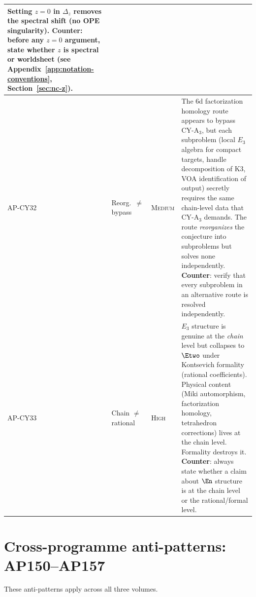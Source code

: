 {\begin{longtable}{@{}p{1.6cm}p{2.4cm}lp{7.4cm}@{}}
  Setting $z = 0$ in $\Delta_z$ removes the spectral shift
  (no OPE singularity).
  \textbf{Counter}: before any $z = 0$ argument, state
  whether $z$ is spectral or worldsheet
  (see Appendix~\ref{app:notation-conventions},
  Section~\ref{sec:nc-z}). \\
\midrule
AP-CY32 & Reorg.\ $\neq$ bypass & \textsc{Medium} &
  The 6d factorization homology route appears to bypass
  CY-A$_3$, but each subproblem (local $E_3$ algebra for
  compact targets, handle decomposition of K3, VOA
  identification of output) secretly requires the same
  chain-level data that CY-A$_3$ demands.
  The route \emph{reorganizes} the conjecture into
  subproblems but solves none independently.
  \textbf{Counter}: verify that every subproblem in an
  alternative route is resolved independently. \\
\midrule
AP-CY33 & Chain $\neq$ rational & \textsc{High} &
  $E_3$ structure is genuine at the \emph{chain} level but
  collapses to $\Etwo$ under Kontsevich formality (rational
  coefficients).  Physical content (Miki automorphism,
  factorization homology, tetrahedron corrections) lives at
  the chain level.  Formality destroys it.
  \textbf{Counter}: always state whether a claim about $\En$
  structure is at the chain level or the rational/formal
  level. \\
\bottomrule
\end{longtable}
}%

\section{Cross-programme anti-patterns: AP150--AP157}
\label{sec:ap-cross-full}

These anti-patterns apply across all three volumes.


